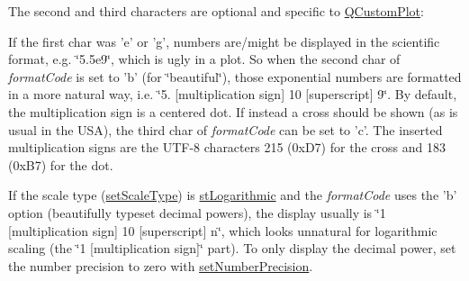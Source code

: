 The second and third characters are optional and specific to \hyperlink{classQCustomPlot}{Q\-Custom\-Plot}\-:\par
 If the first char was 'e' or 'g', numbers are/might be displayed in the scientific format, e.\-g. \char`\"{}5.\-5e9\char`\"{}, which is ugly in a plot. So when the second char of {\itshape format\-Code} is set to 'b' (for \char`\"{}beautiful\char`\"{}), those exponential numbers are formatted in a more natural way, i.\-e. \char`\"{}5.
\mbox{[}multiplication sign\mbox{]} 10 \mbox{[}superscript\mbox{]} 9\char`\"{}. By default, the multiplication sign is a centered dot. If instead a cross should be shown (as is usual in the U\-S\-A), the third char of {\itshape format\-Code} can be set to 'c'. The inserted multiplication signs are the U\-T\-F-\/8 characters 215 (0x\-D7) for the cross and 183 (0x\-B7) for the dot.

If the scale type (\hyperlink{classQCPAxis_adb6c5c45bdf899ea221881dd3b43b406}{set\-Scale\-Type}) is \hyperlink{classQCPAxis_a36d8e8658dbaa179bf2aeb973db2d6f0abf5b785ad976618816dc6f79b73216d4}{st\-Logarithmic} and the {\itshape format\-Code} uses the 'b' option (beautifully typeset decimal powers), the display usually is \char`\"{}1 \mbox{[}multiplication sign\mbox{]} 10
\mbox{[}superscript\mbox{]} n\char`\"{}, which looks unnatural for logarithmic scaling (the \char`\"{}1 \mbox{[}multiplication sign\mbox{]}\char`\"{} part). To only display the decimal power, set the number precision to zero with \hyperlink{classQCPAxis_a21dc8023ad7500382ad9574b48137e63}{set\-Number\-Precision}.

